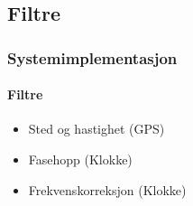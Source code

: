 \documentclass[xcolor=table]{beamer}
\begin{document}
\subsection{Filtre}
\begin{frame}
\frametitle{Systemimplementasjon}
  \framesubtitle{Filtre}
  \begin{itemize}
        \setlength\itemsep{2em}
    \item Sted og hastighet (GPS)
    \item Fasehopp (Klokke)
    \item Frekvenskorreksjon (Klokke)
  \end{itemize}
\end{frame}
\end{document}
